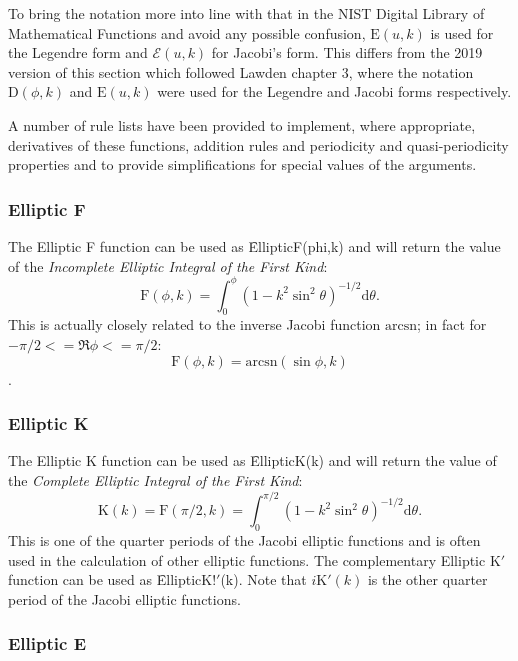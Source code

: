 To bring the notation more into line with that in the NIST Digital Library of
Mathematical Functions and avoid any possible confusion, $\mathrm{E}(u, k)$ is used for
the Legendre form and $\mathcal{E}(u, k)$ for Jacobi's form.
This differs from the 2019 version of this section which followed Lawden
\cite{Lawden:89} chapter 3, where the notation $\mathrm{D}(\phi, k)$ and
$\mathrm{E}(u, k)$ were used for the Legendre and Jacobi forms respectively.

A number of rule lists have been provided to implement, where appropriate,
derivatives of these functions, addition rules and periodicity and
quasi-periodicity properties and to provide simplifications for special values
of the arguments.

\subsubsection{Elliptic F}
\hypertarget{operator:ELLIPTICF}{}

The Elliptic F function can be used as \f{EllipticF(phi,k)} and
will return the value of the \emph{Incomplete Elliptic Integral of the
First Kind}:
\[\mathrm{F}(\phi, k)=\int_0^\phi(1-k^2 \sin^2 \theta)^{-1/2} \mathrm{d}\theta.\]
This is actually closely related to the inverse Jacobi function
$\mathrm{arcsn}$; in fact for $-\pi/2 <= \Re \phi <=\pi/2$:
\[ \mathrm{F}(\phi, k) = \mathrm{arcsn}(\sin \phi, k) \].

\subsubsection{Elliptic K}
\hypertarget{operator:ELLIPTICK}{}
\hypertarget{operator:ELLIPTICK'}{}

The Elliptic K function can be used as \f{EllipticK(k)} and will
return the value of the \emph{Complete Elliptic Integral of the
First Kind}:
\[\mathrm{K}(k)=\mathrm{F}(\pi/2, k) =\int_0^{\pi/2}(1-k^2 \sin^2 \theta)^{-1/2}\mathrm{d}\theta.\]
This is one of the quarter periods of the Jacobi elliptic
functions and is often used in the calculation of other elliptic functions.
The complementary Elliptic K$'$ function can be used as \f{EllipticK!$'$(k)}.
Note that $i\mathrm{K}'(k)$ is the other quarter period of the Jacobi
elliptic functions.

\subsubsection{Elliptic E}
\hypertarget{operator:ELLIPTICE}{}
\hypertarget{operator:ELLIPTICE'}{}

